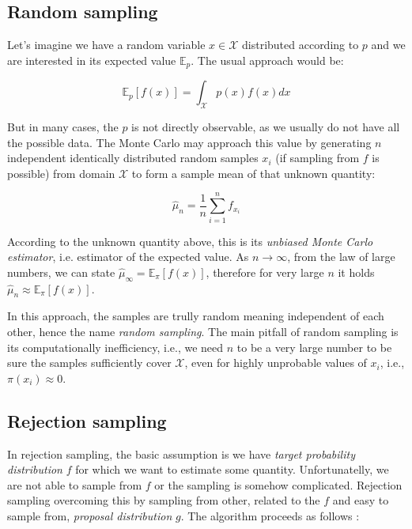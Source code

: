 \documentclass[
  digital, %
  oneside, %
  lof,     %
  lot,     %
]{fithesis4}
\begin{document}
\subsection{Random sampling}

Let's imagine we have a random variable 
$x \in \mathcal{X}$ distributed according to 
$p$ and we are interested in its expected 
value $\mathbb{E}_p$. 
The usual approach would be:

\begin{equation}\label{eq:random-sampling-expectation}
  \mathbb{E}_{p}\left[ f(x) \right] = \int_{\mathcal{X}} p \left( x \right) f \left( x \right) dx
\end{equation}

But in many cases, the $p$ is not directly 
observable, as we usually do not have all the 
possible data.
The Monte Carlo may approach this value by 
generating $n$ independent identically distributed 
random samples $x_i$ (if sampling from $f$ is 
possible) from domain $\mathcal{X}$ to form a 
sample mean of that unknown quantity:

\begin{equation}
  \hat{\mu}_n = \frac{1}{n} \sum_{i=1}^{n} f_{x_i}
\end{equation}

According to the unknown quantity above, this 
is its \textit{unbiased Monte Carlo estimator}, i.e. 
estimator of the expected value. 
As $n \to \infty$, from the law of large numbers, 
we can state 
$\hat{\mu}_{\infty} = \mathbb{E}_{\pi}\left[ f(x) \right]$, 
therefore for very large $n$ it holds 
$\hat{\mu}_n \approx \mathbb{E}_{\pi}\left[ f(x) \right]$.

In this approach, the samples are trully 
random meaning independent of each other, 
hence the name \textit{random sampling}.
The main pitfall of random sampling is its 
computationally inefficiency, i.e., we 
need $n$ to be a very large number to be 
sure the samples sufficiently cover 
$\mathcal{X}$, even for highly unprobable
values of $x_i$, i.e., $\pi(x_i) \approx 0$.


\subsection{Rejection sampling}
\label{sec:rejection-sampling}

In rejection sampling, the basic assumption is we have \textit{target
probability distribution} $f$ for which we want to estimate
some quantity. Unfortunatelly, we are not able to sample
from $f$ or the sampling is somehow complicated.
Rejection sampling overcoming this by sampling
from other, related to the $f$ and easy to sample from, 
\textit{proposal distribution} $g$.
The algorithm proceeds as follows \cite{beichl2000}:
\end{document}
